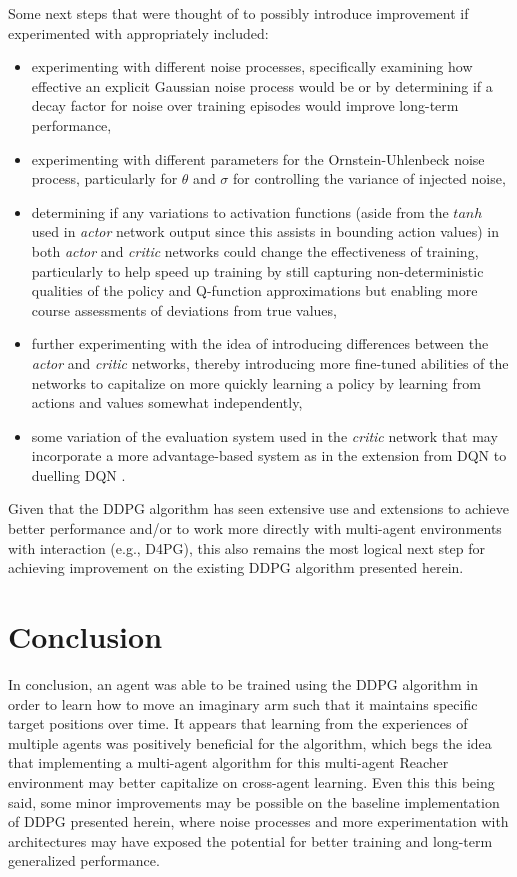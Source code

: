 \documentclass[11pt]{article}
\begin{document}
	Some next steps that were thought of to possibly introduce improvement if experimented with appropriately included:
	\begin{itemize}
		\item experimenting with different noise processes, specifically examining how effective an explicit Gaussian noise process would be or by determining if a decay factor for noise over training episodes would improve long-term performance,
		\item experimenting with different parameters for the Ornstein-Uhlenbeck noise process, particularly for $\theta$ and $\sigma$ for controlling the variance of injected noise,
		\item determining if any variations to activation functions (aside from the $tanh$ used in \textit{actor} network output since this assists in bounding action values) in both \textit{actor} and \textit{critic} networks could change the effectiveness of training, particularly to help speed up training by still capturing non-deterministic qualities of the policy and Q-function approximations but enabling more course assessments of deviations from true values,
		\item further experimenting with the idea of introducing differences between the \textit{actor} and \textit{critic} networks, thereby introducing more fine-tuned abilities of the networks to capitalize on more quickly learning a policy by learning from actions and values somewhat independently,
		\item some variation of the evaluation system used in the \textit{critic} network that may incorporate a more advantage-based system as in the extension from DQN to duelling DQN \cite{duelling}.
	\end{itemize}
	
	Given that the DDPG algorithm has seen extensive use and extensions to achieve better performance and/or to work more directly with multi-agent environments with interaction (e.g., D4PG), this also remains the most logical next step for achieving improvement on the existing DDPG algorithm presented herein.
	
	\section{Conclusion}
	
	In conclusion, an agent was able to be trained using the DDPG algorithm in order to learn how to move an imaginary arm such that it maintains specific target positions over time. It appears that learning from the experiences of multiple agents was positively beneficial for the algorithm, which begs the idea that implementing a multi-agent algorithm for this multi-agent Reacher environment may better capitalize on cross-agent learning. Even this this being said, some minor improvements may be possible on the baseline implementation of DDPG presented herein, where noise processes and more experimentation with architectures may have exposed the potential for better training and long-term generalized performance.
	
\end{document}
